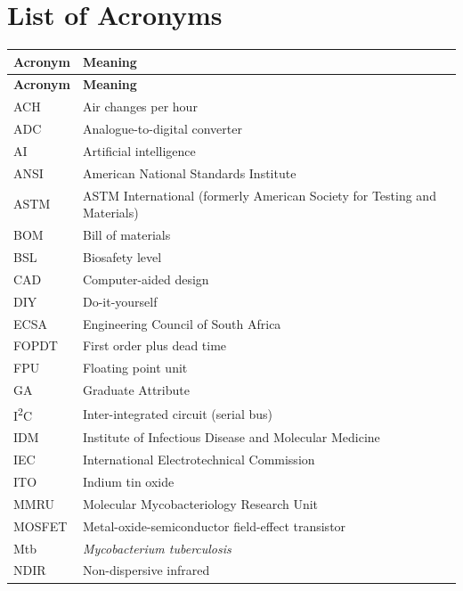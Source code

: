 \chapter{List of Acronyms}
\label{ch:gloss}
\small
\renewcommand{\arraystretch}{1.12}
\begin{longtable}{@{}p{2.4cm} p{}@{}}
\toprule
\textbf{Acronym} & \textbf{Meaning} \\
\midrule
\endfirsthead
\toprule
\textbf{Acronym} & \textbf{Meaning} \\
\midrule
\endhead
\bottomrule
\endlastfoot
ACH & Air changes per hour \\
ADC & Analogue-to-digital converter \\
AI & Artificial intelligence \\
ANSI & American National Standards Institute \\
ASTM & ASTM International (formerly American Society for Testing and Materials) \\
BOM & Bill of materials \\
BSL & Biosafety level \\
CAD & Computer-aided design \\
DIY & Do-it-yourself \\
ECSA & Engineering Council of South Africa \\
FOPDT & First order plus dead time \\
FPU & Floating point unit \\
GA & Graduate Attribute \\
I\textsuperscript{2}C & Inter-integrated circuit (serial bus) \\
IDM & Institute of Infectious Disease and Molecular Medicine \\
IEC & International Electrotechnical Commission \\
ITO & Indium tin oxide \\
MMRU & Molecular Mycobacteriology Research Unit \\
MOSFET & Metal-oxide-semiconductor field-effect transistor \\
Mtb & \textit{Mycobacterium tuberculosis} \\
NDIR & Non-dispersive infrared \\

\end{longtable}
